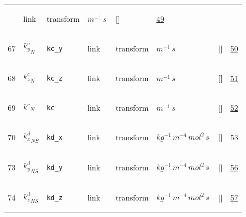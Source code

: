 \begin{longtable}{|p{1cm}|p{3cm}|p{3cm}|p{7cm}|p{3.0cm}|p{3cm}|p{2cm}|p{1cm}|}
             & link
             & \begin{lay}transform \end{lay}
             & $ m^{-1} \,s \, $
             & []
             & \hyperlink{"e:49"}{ 49 }
                 \\
    67
             & \hypertarget{"v:67"}{ $ {k^{c}_{y}}_{N} $}
             & \verb|kc_y|
             & link
             & \begin{lay}transform \end{lay}
             & $ m^{-1} \,s \, $
             & []
             & \hyperlink{"e:50"}{ 50 }
                 \\
    68
             & \hypertarget{"v:68"}{ $ {k^{c}_{z}}_{N} $}
             & \verb|kc_z|
             & link
             & \begin{lay}transform \end{lay}
             & $ m^{-1} \,s \, $
             & []
             & \hyperlink{"e:51"}{ 51 }
                 \\
    69
             & \hypertarget{"v:69"}{ $ {k^{c}}_{N} $}
             & \verb|kc|
             & link
             & \begin{lay}transform \end{lay}
             & $ m^{-1} \,s \, $
             & []
             & \hyperlink{"e:52"}{ 52 }
                 \\
    70
             & \hypertarget{"v:70"}{ $ {k^{d}_{x}}_{{N S}} $}
             & \verb|kd_x|
             & link
             & \begin{lay}transform \end{lay}
             & $ kg^{-1} \,m^{-4} \,mol^{2} \,s \, $
             & []
             & \hyperlink{"e:53"}{ 53 }
                 \\
    73
             & \hypertarget{"v:73"}{ $ {k^{d}_{y}}_{{N S}} $}
             & \verb|kd_y|
             & link
             & \begin{lay}transform \end{lay}
             & $ kg^{-1} \,m^{-4} \,mol^{2} \,s \, $
             & []
             & \hyperlink{"e:56"}{ 56 }
                 \\
    74
             & \hypertarget{"v:74"}{ $ {k^{d}_{z}}_{{N S}} $}
             & \verb|kd_z|
             & link
             & \begin{lay}transform \end{lay}
             & $ kg^{-1} \,m^{-4} \,mol^{2} \,s \, $
             & []
             & \hyperlink{"e:57"}{ 57 }

\end{longtable}
